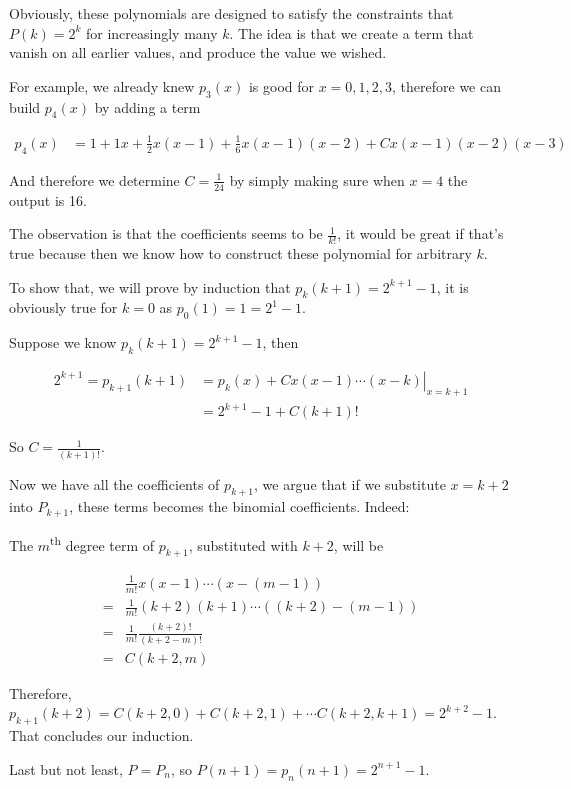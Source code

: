 \documentclass{article}
\begin{document}
Obviously, these polynomials are designed to satisfy the constraints that $ P(k) = 2^k $ for increasingly many $ k $. The idea is that we create a term that vanish on all earlier values, and produce the value we wished.

For example, we already knew $ p_3(x) $ is good for $ x = 0, 1, 2, 3 $, therefore we can build $ p_4(x) $ by adding a term 

\begin{align*}
  p_4(x) &= 1 + 1x + \frac{1}{2}x(x-1) + \frac{1}{6}x(x-1)(x-2) + Cx(x-1)(x-2)(x-3)
\end{align*}

And therefore we determine $ C = \frac{1}{24} $ by simply making sure when $ x = 4 $ the output is 16. 

The observation is that the coefficients seems to be $ \frac{1}{k!} $, it would be great if that's true because then we know how to construct these polynomial for arbitrary $ k $.

To show that, we will prove by induction that $ p_k(k+1) = 2^{k + 1} - 1 $, it is obviously true for $ k = 0 $ as $ p_0(1) = 1 = 2^{1} - 1 $.

Suppose we know $ p_k(k+1) = 2^{k + 1} - 1 $, then

\begin{align*}
  2^{k+1} = p_{k+1}(k+1) &= \left. p_k(x) + Cx(x-1)\cdots(x - k) \right|_{x=k+1} \\
                         &= 2^{k + 1} - 1 + C (k + 1)!
\end{align*}

So $ C = \frac{1}{(k + 1)!} $.

Now we have all the coefficients of $ p_{k+1} $, we argue that if we substitute $ x = k + 2 $ into $ P_{k+1} $, these terms becomes the binomial coefficients. Indeed:

The $ m $\textsuperscript{th} degree term of $ p_{k+1} $, substituted with $ k + 2 $, will be

\begin{align*}
   & \frac{1}{m!}x(x-1)\cdots(x-(m-1))         \\
  =& \frac{1}{m!}(k+2)(k+1)\cdots((k+2)-(m-1)) \\
  =& \frac{1}{m!}\frac{(k+2)!}{(k+2 - m)!}     \\
  =& C(k+2, m)
\end{align*}

Therefore, $ p_{k+1}(k+2) = C(k+2, 0) + C(k+2, 1) + \cdots C(k+2, k+1) = 2^{k+2} - 1 $. That concludes our induction.

Last but not least, $ P = P_n $, so $ P(n + 1) = p_n(n + 1) = 2^{n+1} - 1 $.
\end{document}
